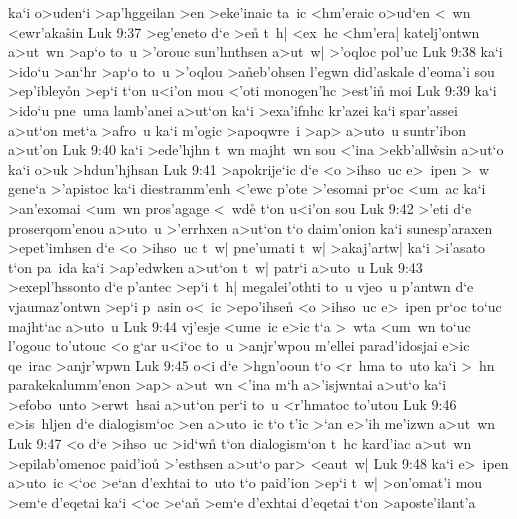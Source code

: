 ka`i
o>uden`i
>ap'hggeilan
>en
>eke'inaic
ta~ic
<hm'eraic
o>ud`en
<~wn
<ewr'aka\r{s}in\bibvsend
{}
\vs Luk 9:37
>eg'eneto
d`e
>e\r{n}
t~h|
<ex~hc
<hm'era|
katelj'ontwn
a>ut~wn
>ap`o
to~u
>'orouc
sun'hnthsen
a>ut~w|
>'oqloc
pol'uc\bibvsend
\vs Luk 9:38
ka`i
>ido`u
>an`hr
>ap`o
to~u
>'oqlou
>a\r{n}eb'ohsen
l'egwn
did'askale
d'eoma'i
sou
>ep'ibley\r{o}n
>ep`i
t`on
u<i'on
mou
<'oti
monogen'hc
>est'in\r{}
moi\bibvsend
\vs Luk 9:39
ka`i
>ido`u
pne~uma
lamb'anei
a>ut`on
ka`i
>exa'ifnhc
kr'azei
ka`i
spar'assei
a>ut`on
met`a
>afro~u
ka`i
m'ogic
>apoqwre~i
>ap>
a>uto~u
suntr'ibon
a>ut'on\bibvsend
\vs Luk 9:40
ka`i
>ede'hjhn
t~wn
majht~wn
sou
<'ina
>ekb'all\r{w}sin
a>ut`o
ka`i
o>uk
>hdun'hjhsan\bibvsend
\vs Luk 9:41
>apokrije`ic
d`e
<o
>ihso~uc
e>~ipen
>~w
gene`a
>'apistoc
ka`i
diestramm'enh
<'ewc
p'ote
>'esomai
pr`oc
<um~ac
ka`i
>an'exomai
<um~wn
pros'agage
<~wde\r{}
t`on
u<i'on
sou\bibvsend
\vs Luk 9:42
>'eti
d`e
proserqom'enou
a>uto~u
>'errhxen
a>ut`on
t`o
daim'onion
ka`i
sunesp'araxen
>epet'imhsen
d`e
<o
>ihso~uc
t~w|
pne'umati
t~w|
>akaj'artw|
ka`i
>i'asato
t`on
pa~ida
ka`i
>ap'edwken
a>ut`on
t~w|
patr`i
a>uto~u\bibvsend
\vs Luk 9:43
>exepl'hssonto
d`e
p'antec
>ep`i
t~h|
megalei'othti
to~u
vjeo~u
p'antwn
d`e
vjaumaz'ontwn
>ep`i
p~asin
o<~ic
>epo'ihsen\r{}
<o
>ihso~uc
e>~ipen
pr`oc
to`uc
majht`ac
a>uto~u\bibvsend
\vs Luk 9:44
vj'esje
<ume~ic
e>ic
t`a
>~wta
<um~wn
to`uc
l'ogouc
to'utouc
<o
g`ar
u<i`oc
to~u
>anjr'wpou
m'ellei
parad'idosjai
e>ic
qe~irac
>anjr'wpwn\bibvsend
\vs Luk 9:45
o<i
d`e
>hgn'ooun
t`o
<r~hma
to~uto
ka`i
>~hn
parakekalumm'enon
>ap>
a>ut~wn
<'ina
m`h
a>'isjwntai
a>ut`o
ka`i
>efobo~unto
>erwt~hsai
a>ut`on
per`i
to~u
<r'hmatoc
to'utou\bibvsend
\vs Luk 9:46
e>is~hljen
d`e
dialogism`oc
>en
a>uto~ic
t`o
t'ic
>`an
e>'ih
me'izwn
a>ut~wn\bibvsend
\vs Luk 9:47
<o
d`e
>ihso~uc
>id`w\r{n}
t`on
dialogism`on
t~hc
kard'iac
a>ut~wn
>epilab'omenoc
paid'io\r{u}
>'esthsen
a>ut`o
par>
<eaut~w|\bibvsend
\vs Luk 9:48
ka`i
e>~ipen
a>uto~ic
<`oc
>e`an
d'exhtai
to~uto
t`o
paid'ion
>ep`i
t~w|
>on'omat'i
mou
>em`e
d'eqetai
ka`i
<`oc
>e`a\r{n}
>em`e
d'exhtai
d'eqetai
t`on
>aposte'ilant'a
